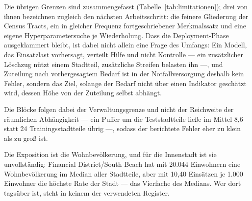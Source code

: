 \documentclass[12pt,a4paper]{article}
\begin{document}
Die übrigen Grenzen sind zusammengefasst (Tabelle~\ref{tab:limitationen}); drei
von ihnen bezeichnen zugleich den nächsten Arbeitsschritt: die feinere
Gliederung der Census Tracts, ein in gleicher Frequenz fortgeschriebener
Merkmalssatz und eine eigene Hyperparametersuche je Wiederholung. Dass die
Deployment-Phase ausgeklammert bleibt, ist dabei nicht allein eine Frage des
Umfangs: Ein Modell, das Einsatzlast vorhersagt, verteilt Hilfe und nicht
Kontrolle --- ein zusätzlicher Löschzug nützt einem Stadtteil, zusätzliche
Streifen belasten ihn ---, und Zuteilung nach vorhergesagtem Bedarf ist in der
Notfallversorgung deshalb kein Fehler, sondern das Ziel, solange der Bedarf
nicht über einen Indikator geschätzt wird, dessen Höhe von der Zuteilung selbst
abhängt.

Die Blöcke folgen dabei der Verwaltungsgrenze und nicht der Reichweite der räumlichen Abhängigkeit — ein Puffer um die Teststadtteile ließe im Mittel 8,6 statt 24 Trainingsstadtteile übrig —, sodass der berichtete Fehler eher zu klein als zu groß ist.

Die Exposition ist die Wohnbevölkerung, und für die Innenstadt ist sie unvollständig: Financial District/South Beach hat mit 20.044 Einwohnern eine Wohnbevölkerung im Median aller Stadtteile, aber mit 10,40 Einsätzen je 1.000 Einwohner die höchste Rate der Stadt — das Vierfache des Medians. Wer dort tagsüber ist, steht in keinem der verwendeten Register.
\end{document}
